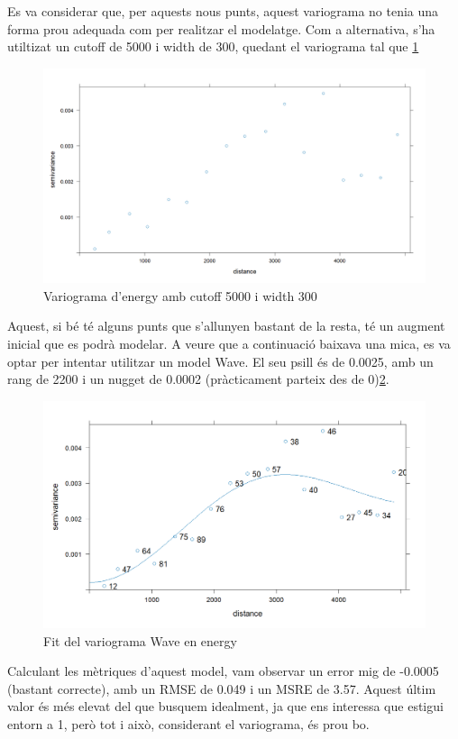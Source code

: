 Es va considerar que, per aquests nous punts, aquest variograma no tenia una forma prou adequada com per realitzar el modelatge. Com a alternativa, s'ha utiltizat un cutoff de 5000 i width de 300, quedant el variograma tal que \ref{fig:geo_new_energy}

\begin{figure}[H]
    \centering
    \includegraphics[width=0.75\linewidth]{Images//7_Geospatial//3_new/energy_5000_300_variogram.png}
    \caption{Variograma d'energy amb cutoff 5000 i width 300}
    \label{fig:geo_new_energy}
\end{figure}

Aquest, si bé té alguns punts que s'allunyen bastant de la resta, té un augment inicial que es podrà modelar. A veure que a continuació baixava una mica, es va optar per intentar utilitzar un model Wave. El seu psill és de 0.0025, amb un rang de 2200 i un nugget de 0.0002 (pràcticament parteix des de 0)\ref{fig:geo_new_energy_fit}.

\begin{figure}[H]
    \centering
    \includegraphics[width=0.5\linewidth]{Images//7_Geospatial//3_new/energy_variogram_fit.png}
    \caption{Fit del variograma Wave en energy}
    \label{fig:geo_new_energy_fit}
\end{figure}

Calculant les mètriques d'aquest model, vam observar un error mig de -0.0005 (bastant correcte), amb un RMSE de 0.049 i un MSRE de 3.57. Aquest últim valor és més elevat del que busquem idealment, ja que ens interessa que estigui entorn a 1, però tot i això, considerant el variograma, és prou bo.


